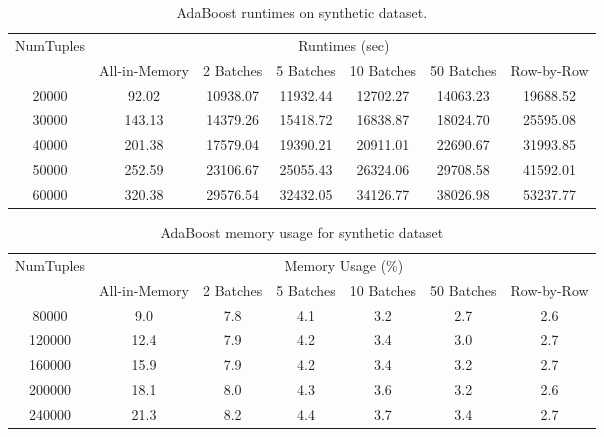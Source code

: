 \begin{table}[!htbp]
\small
\centering
\begin{tabular}{|c|c|c|c|c|c|c|}
\hline
\multirow{2}{*}{NumTuples} & \multicolumn{6}{|c|}{Runtimes (sec)}\\
\cline{2-7}
& All-in-Memory & 2 Batches & 5 Batches & 10 Batches & 50 Batches & Row-by-Row\\
\hline
20000&92.02 &10938.07 &11932.44 &12702.27 &14063.23 &19688.52 \\
\hline
30000&143.13 &14379.26 &15418.72 &16838.87 &18024.70 &25595.08 \\
\hline
40000&201.38 &17579.04 &19390.21 &20911.01 &22690.67 &31993.85 \\
\hline
50000&252.59 &23106.67 &25055.43 &26324.06 &29708.58 &41592.01 \\
\hline
60000&320.38 &29576.54 &32432.05 &34126.77 &38026.98 &53237.77 \\
\hline
\end{tabular}
\caption{AdaBoost runtimes on synthetic dataset.}
\label{tab:adaSynth1}
\end{table}

\begin{table}[!htbp]
\small
\centering
\begin{tabular}{|c|c|c|c|c|c|c|}
\hline
\multirow{2}{*}{NumTuples} & \multicolumn{6}{|c|}{Memory Usage (\%)}\\
\cline{2-7}
& All-in-Memory & 2 Batches & 5 Batches & 10 Batches & 50 Batches & Row-by-Row\\
\hline
80000& 9.0&7.8&4.1 &3.2 &2.7&2.6 \\
\hline
120000& 12.4&7.9 &4.2 &3.4&3.0 &2.7 \\
\hline
160000& 15.9&7.9 &4.2 &3.4 &3.2 &2.7 \\
\hline
200000& 18.1&8.0 &4.3 &3.6 &3.2 &2.6 \\
\hline
240000& 21.3&8.2 &4.4 &3.7 &3.4 &2.7 \\
\hline
\end{tabular}
\caption{AdaBoost memory usage for synthetic dataset}
\label{tab:adaSynth2}
\end{table}
